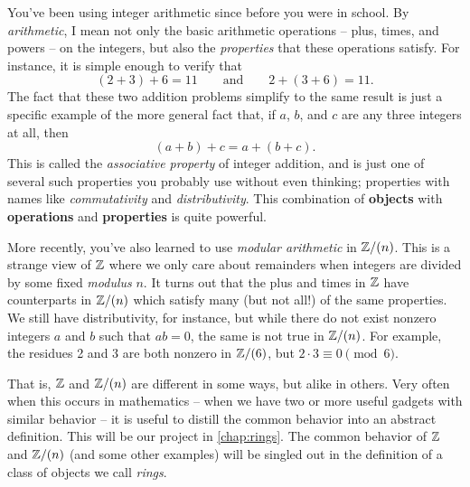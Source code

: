 You've been using integer arithmetic since before you were in school. By \emph{arithmetic}, I mean not only the basic arithmetic operations -- plus, times, and powers -- on the integers, but also the \emph{properties} that these operations satisfy. For instance, it is simple enough to verify that \[ (2 + 3) + 6 = 11 \quad\quad \mathrm{and} \quad\quad 2 + (3 + 6) = 11. \] The fact that these two addition problems simplify to the same result is just a specific example of the more general fact that, if \(a\), \(b\), and \(c\) are any three integers at all, then \[ (a+b)+c = a+(b+c). \] This is called the \emph{associative property} of integer addition, and is just one of several such properties you probably use without even thinking; properties with names like \emph{commutativity} and \emph{distributivity}. This combination of \textbf{objects} with \textbf{operations} and \textbf{properties} is quite powerful.

More recently, you've also learned to use \emph{modular arithmetic} in \(\mathbb{Z}/(n)\). This is a strange view of \(\mathbb{Z}\) where we only care about remainders when integers are divided by some fixed \emph{modulus} \(n\). It turns out that the plus and times in \(\mathbb{Z}\) have counterparts in \(\mathbb{Z}/(n)\) which satisfy many (but not all!) of the same properties. We still have distributivity, for instance, but while there do not exist nonzero integers \(a\) and \(b\) such that \(ab = 0\), the same is not true in \(\mathbb{Z}/(n)\). For example, the residues 2 and 3 are both nonzero in \(\mathbb{Z}/(6)\), but \(2 \cdot 3 \equiv 0 \pmod{6}\).

That is, \(\mathbb{Z}\) and \(\mathbb{Z}/(n)\) are different in some ways, but alike in others. Very often when this occurs in mathematics -- when we have two or more useful gadgets with similar behavior -- it is useful to distill the common behavior into an abstract definition. This will be our project in \autoref{chap:rings}. The common behavior of \(\mathbb{Z}\) and \(\mathbb{Z}/(n)\) (and some other examples) will be singled out in the definition of a class of objects we call \emph{rings}.